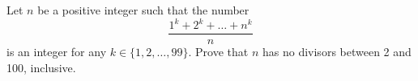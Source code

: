 Let $n$ be a positive integer such that the number \[\frac{1^k + 2^k + \dots + n^k}{n}\] is an integer for any $k \in \{1, 2, \dots, 99\}$. Prove that $n$ has no divisors between 2 and 100, inclusive.